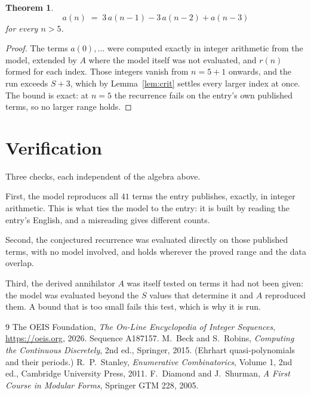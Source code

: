 \documentclass[11pt,a4paper]{article}
\theoremstyle{plain}
\newtheorem{theorem}{Theorem}
\theoremstyle{definition}
\begin{document}
\begin{theorem}
\[
a(n)\;=\;3\,a(n-1) - 3\,a(n-2) + a(n-3)
\]
for every $n>5$.
\end{theorem}

\begin{proof}
The terms $a(0),\dots$ were computed exactly in integer arithmetic from the model, extended by
$A$ where the model itself was not evaluated, and $r(n)$ formed for each index. Those integers
vanish from $n=5+1$ onwards, and the run exceeds $S+3$, which by
Lemma~\ref{lem:crit} settles every larger index at once. The bound is exact: at $n=5$ the recurrence fails on the entry's own published terms, so no larger range holds.
\end{proof}

\section{Verification}

Three checks, each independent of the algebra above.

First, the model reproduces all $41$ terms the entry publishes, exactly, in integer
arithmetic. This is what ties the model to the entry: it is built by reading the entry's
English, and a misreading gives different counts.

Second, the conjectured recurrence was evaluated directly on those published terms, with no
model involved, and holds wherever the proved range and the data overlap.

Third, the derived annihilator $A$ was itself tested on terms it had not been given: the model
was evaluated beyond the $S$ values that determine it and $A$ reproduced them. A bound that is
too small fails this test, which is why it is run.

\begin{thebibliography}{9}
 The OEIS Foundation, \emph{The On-Line Encyclopedia of Integer
Sequences}, \url{https://oeis.org}, 2026. Sequence A187157.
 M.~Beck and S.~Robins, \emph{Computing the Continuous Discretely},
2nd ed., Springer, 2015. (Ehrhart quasi-polynomials and their periods.)
 R.~P.~Stanley, \emph{Enumerative Combinatorics}, Volume 1, 2nd ed.,
Cambridge University Press, 2011.
 F.~Diamond and J.~Shurman, \emph{A First Course in Modular Forms},
Springer GTM 228, 2005.
\end{thebibliography}
\end{document}
